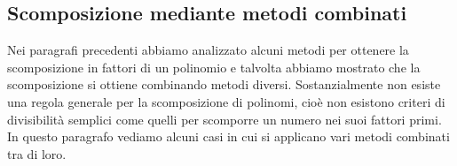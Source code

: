 %  
% 
% 
% 
%  
% 
% 
% 
% 
% 

\subsection{Scomposizione mediante metodi combinati}
\label{subsec:divpol_metodicombinati}

Nei paragrafi precedenti abbiamo analizzato alcuni metodi per ottenere
la scomposizione in fattori di un polinomio e talvolta abbiamo mostrato
che la scomposizione si ottiene combinando metodi diversi.
Sostanzialmente non esiste una regola generale per la scomposizione di
polinomi, cioè non esistono criteri di divisibilità semplici come
quelli per scomporre un numero nei suoi fattori primi. In questo
paragrafo vediamo alcuni casi in cui si applicano vari metodi combinati
tra di loro.

